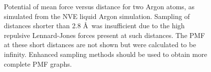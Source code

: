 \documentclass[12pt, letterpaper]{article}
\begin{document}
\begin{figure} [p]
	\centering
	\caption{Potential of mean force versus distance for two Argon atoms, as simulated from the NVE liquid Argon simulation. Sampling of distances shorter than 2.8 \AA\ was insufficient due to the high repulsive Lennard-Jones forces present at such distances. The PMF at these short distances are not shown but were calculated to be infinity. Enhanced sampling methods should be used to obtain more complete PMF graphs.}
	\label{fig:pmf}
\end{figure}
\end{document}
